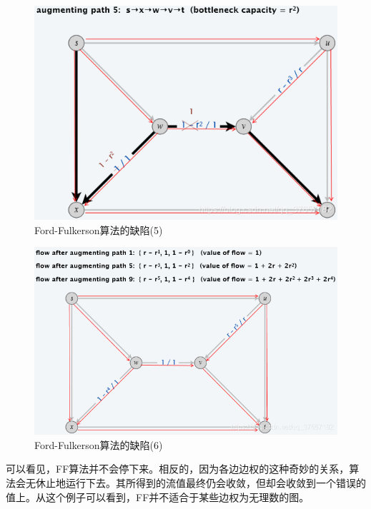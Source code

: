 \begin{figure}[hbt]
	\centering
	\includegraphics[scale=0.6]{image/network-flow-backbone5.png}
	\caption{Ford-Fulkerson算法的缺陷(5)}\label{fig:network-flow-backbone5}
\end{figure}

\begin{figure}[hbt]
	\centering
	\includegraphics[scale=0.6]{image/network-flow-backbone6.png}
	\caption{Ford-Fulkerson算法的缺陷(6)}\label{fig:network-flow-backbone6}
\end{figure}

\par 可以看见，FF算法并不会停下来。相反的，因为各边边权的这种奇妙的关系，算法会无休止地运行下去。其所得到的流值最终仍会收敛，但却会收敛到一个错误的值上。从这个例子可以看到，FF并不适合于某些边权为无理数的图。